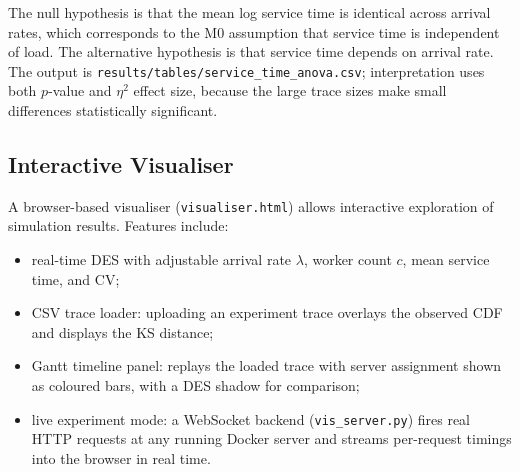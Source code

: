 The null hypothesis is that the mean log service time is identical across arrival rates, which corresponds to the M0 assumption that service time is independent of load. The alternative hypothesis is that service time depends on arrival rate. The output is \texttt{results/tables/service\_time\_anova.csv}; interpretation uses both $p$-value and $\eta^2$ effect size, because the large trace sizes make small differences statistically significant.

\subsection{Interactive Visualiser}

A browser-based visualiser (\texttt{visualiser.html}) allows interactive exploration of simulation results. Features include:

\begin{itemize}
    \item real-time DES with adjustable arrival rate $\lambda$, worker count $c$, mean service time, and CV;
    \item CSV trace loader: uploading an experiment trace overlays the observed CDF and displays the KS distance;
    \item Gantt timeline panel: replays the loaded trace with server assignment shown as coloured bars, with a DES shadow for comparison;
    \item live experiment mode: a WebSocket backend (\texttt{vis\_server.py}) fires real HTTP requests at any running Docker server and streams per-request timings into the browser in real time.
\end{itemize}

